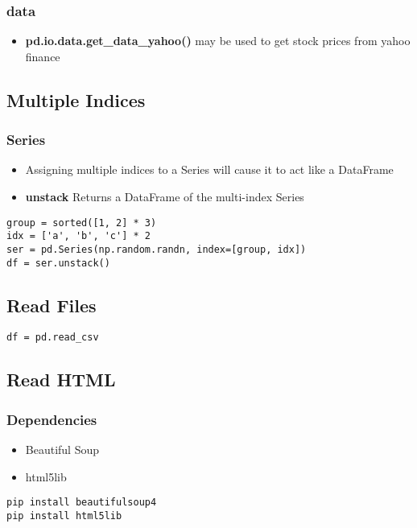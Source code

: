 %
\subsubsection{data}
\begin{itemize}

  \item \textbf{pd.io.data.get\_data\_yahoo()} may be used to get stock prices
    from yahoo finance
\end{itemize}

\subsection{Multiple Indices}

\subsubsection{Series}
\begin{itemize}

  \item Assigning multiple indices to a Series will cause it to act like a
    DataFrame

  \item \textbf{unstack} Returns a DataFrame of the multi-index Series
\end{itemize}
\begin{lstlisting}
group = sorted([1, 2] * 3)
idx = ['a', 'b', 'c'] * 2
ser = pd.Series(np.random.randn, index=[group, idx])
df = ser.unstack()
\end{lstlisting}

\subsection{Read Files}
\begin{lstlisting}
df = pd.read_csv
\end{lstlisting}

\subsection{Read HTML}

%
\subsubsection{Dependencies}
\begin{itemize}

  \item Beautiful Soup

  \item html5lib
\end{itemize}
\begin{lstlisting}
pip install beautifulsoup4
pip install html5lib
\end{lstlisting}

